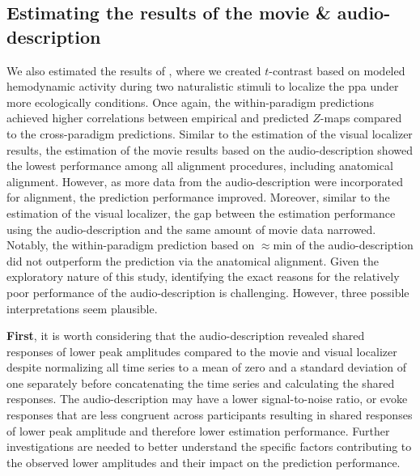 \subsection{Estimating the results of the movie \& audio-description}
%
We also estimated the results of \citet{haeusler2022processing}, where we
created $t$-contrast based on modeled hemodynamic activity during two
naturalistic stimuli to localize the \ac{ppa} under more ecologically
conditions.
%
Once again, the within-paradigm predictions achieved higher correlations between
empirical and predicted $Z$-maps compared to the cross-paradigm predictions.
%
Similar to the estimation of the visual localizer results, the estimation of the
movie results based on the audio-description showed the lowest performance among
all alignment procedures, including anatomical alignment.
%
However, as more data from the audio-description were incorporated for
alignment, the prediction performance improved.
%
Moreover, similar to the estimation of the visual localizer, the gap between the
estimation performance using the audio-description and the same amount of movie
data narrowed.
%
Notably, the within-paradigm prediction based on $\approx$\unit[15]{min} of the
audio-description did not outperform the prediction via the anatomical
alignment.
%
Given the exploratory nature of this study, identifying the exact reasons for
the relatively poor performance of the audio-description is challenging.
%
However, three possible interpretations seem plausible.
%

\textbf{First}, it is worth considering that the audio-description revealed
shared responses of lower peak amplitudes compared to the movie and visual
localizer despite normalizing all time series to a mean of zero and a standard
deviation of one separately before concatenating the time series and calculating
the shared responses.
%
The audio-description may have a lower signal-to-noise ratio, or evoke responses that are less congruent across participants
resulting in shared responses of lower peak amplitude and therefore lower
estimation performance.
%
Further investigations are needed to better understand the specific factors
contributing to the observed lower amplitudes and their impact on the prediction
performance.


